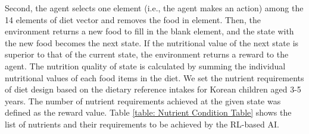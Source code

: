 \documentclass{article}
\begin{document}
Second, the agent selects one element (i.e., the agent makes an action) among the 14 elements of diet vector and removes the food in element. Then, the environment returns a new food to fill in the blank element, and the state with the new food becomes the next state. If the nutritional value of the next state is superior to that of the current state, the environment returns a reward to the agent. The nutrition quality of state is calculated by summing the individual nutritional values of each food items in the diet. We set the nutrient requirements of diet design based on the dietary reference intakes for Korean children aged 3-5 years. The number of nutrient requirements achieved at the given state was defined as the reward value. Table \ref{table: Nutrient Condition Table} shows the list of nutrients and their requirements to be achieved by the RL-based AI.
\end{document}
